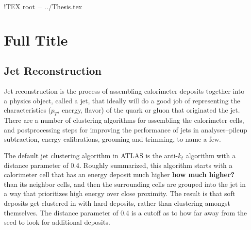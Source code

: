 !TEX root =  ../Thesis.tex

\chapter[RecoPerfChapter]{Full Title}





%









\section{Jet Reconstruction}
Jet reconstruction is the process of assembling calorimeter deposits together into a physics object, called a jet, that ideally will do a good job of representing the characteristics ($p_T$, energy, flavor) of the quark or gluon that originated the jet.  There are a number of clustering algorithms for assembling the calorimeter cells, and postprocessing steps for improving the performance of jets in analyses--pileup subtraction, energy calibrations, grooming and trimming, to name a few.  

The default jet clustering algorithm in ATLAS is the anti-$k_t$ algorithm with a distance parameter of 0.4.  Roughly summarized, this algorithm starts with a calorimeter cell that has an energy deposit much higher \textbf{how much higher?} than its neighbor cells, and then the surrounding cells are grouped into the jet in a way that prioritizes high energy over close proximity.  The result is that soft deposits get clustered in with hard deposits, rather than clustering amongst themselves.  The distance parameter of 0.4 is a cutoff as to how far away from the seed to look for additional deposits.  

